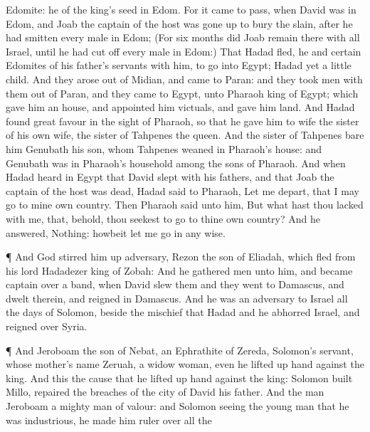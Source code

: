 {Edomite: he
{} of the
king’s
seed in
Edom.
For it came to pass, when
David was in
Edom, and
Joab the
captain of the
host was gone
up to
bury the
slain, after he had
smitten every
male in
Edom;
(For
six
months did
Joab
remain there with all
Israel, until he had cut
off every
male in
Edom:)
That
Hadad
fled, he and
certain
Edomites of his
father’s
servants with him, to
go into
Egypt;
Hadad
{} yet a
little
child.
And they
arose out of
Midian, and
came to
Paran: and they
took
men with them out of
Paran, and they
came to
Egypt, unto
Pharaoh
king of
Egypt; which
gave him an
house, and
appointed him
victuals, and
gave him
land.
And
Hadad
found
great
favour in the
sight of
Pharaoh, so that he
gave him to
wife the
sister of his own
wife, the
sister of
Tahpenes the
queen.
And the
sister of
Tahpenes
bare him
Genubath his
son, whom
Tahpenes
weaned
in
Pharaoh’s
house: and
Genubath was in
Pharaoh’s
household
among the
sons of
Pharaoh.
And when
Hadad
heard in
Egypt that
David
slept with his
fathers, and that
Joab the
captain of the
host was
dead,
Hadad
said to
Pharaoh, Let me
depart, that I may
go to mine own
country.
Then
Pharaoh
said unto him, But what hast thou
lacked with me, that, behold, thou
seekest to
go to thine own
country? And he
answered, Nothing: howbeit let me
go in any
wise.
\par }{\PP {}¶ And
God stirred him
up
{}
adversary,
Rezon the
son of
Eliadah, which
fled from his
lord
Hadadezer
king of
Zobah:
And he
gathered
men unto him, and became
captain over a
band, when
David
slew them
{} and they
went to
Damascus, and
dwelt therein, and
reigned in
Damascus.
And he was an
adversary to
Israel all the
days of
Solomon, beside the
mischief that
Hadad
{} and he
abhorred
Israel, and
reigned over
Syria.
\par }{\PP {}¶ And
Jeroboam the
son of
Nebat, an
Ephrathite of
Zereda,
Solomon’s
servant, whose
mother’s
name
{}
Zeruah, a
widow
woman, even he lifted
up
{}
hand against the
king.
And this
{} the
cause that he lifted
up
{}
hand against the
king:
Solomon
built
Millo,
{}
repaired the
breaches of the
city of
David his
father.
And the
man
Jeroboam
{} a mighty
man of
valour: and
Solomon
seeing the young
man that he was
industrious, he made him
ruler over all the
}
